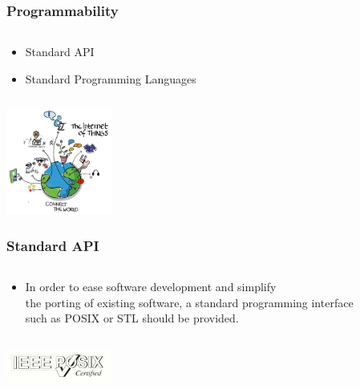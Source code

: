 \documentclass{beamer}
\begin{document}
\begin{frame}
	\frametitle{Programmability}
	\begin{columns}[c]
		\begin{column}{30cm}
			\vspace{.1cm}
			\begin{itemize}
				\justifying
				\item Standard API
				\item Standard Programming Languages
			\end{itemize}
		\end{column}
	\end{columns}
	\hspace*{7cm} \includegraphics[width=3.5cm]{figs/Internet-of-Things-3.jpg}
\end{frame}

\begin{frame}
	\frametitle{Standard API}
	\begin{columns}[c]
		\begin{column}{30cm}
			\vspace{.1cm}
			\begin{itemize}
				\justifying
				\item In order to ease software development and simplify\\
				the porting of existing software, a standard programming interface\\
				such as POSIX or STL should be provided.
			\end{itemize}
		\end{column}
	\end{columns}
	\vspace{1cm}
	\hspace*{7cm} \includegraphics[width=3.5cm]{figs/ieee-posix-certified.jpg}
\end{frame}
\end{document}
